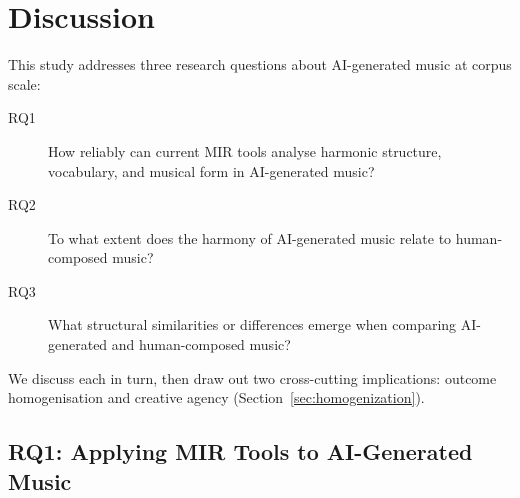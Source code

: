 \documentclass{article}
\begin{document}
\section{Discussion}
\label{sec:discussion}


This study addresses three research questions about AI-generated music at corpus scale:

\begin{description}
  \item[RQ1] How reliably can current MIR tools analyse harmonic structure, vocabulary, and musical form in AI-generated music?
  \item[RQ2] To what extent does the harmony of AI-generated music relate to human-composed music?
  \item[RQ3] What structural similarities or differences emerge when comparing AI-generated and human-composed music?
\end{description}

\noindent We discuss each in turn, then draw out two cross-cutting implications: outcome homogenisation and creative agency (Section~\ref{sec:homogenization}).

\subsection{RQ1: Applying MIR Tools to AI-Generated Music}
\label{sec:disc_mir}


\end{document}
